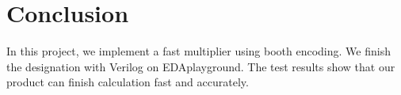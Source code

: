 \documentclass[twoside,twocolumn]{article}
\begin{document}

\section{Conclusion}

In this project, we implement a fast multiplier using booth encoding. We finish the designation with Verilog on EDAplayground. The test results show that our product can finish calculation fast and accurately. %






 

\end{document}
